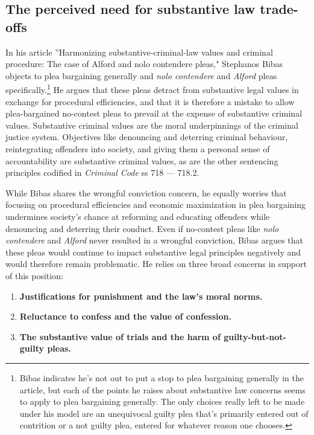 \subsection{The perceived need for substantive law trade-offs}

In his article ''Harmonizing substantive-criminal-law values and criminal procedure: The case of Alford and nolo contendere pleas," Stephanos Bibas objects to plea bargaining generally and \textit{nolo contendere} and \textit{Alford} pleas specifically.\footnote{Bibas indicates he's not out to put a stop to plea bargaining generally in the article, but each of the points he raises about substantive law concerns seems to apply to plea bargaining generally. The only choices really left to be made under his model are an unequivocal guilty plea that's primarily entered out of contrition or a not guilty plea, entered for whatever reason one chooses.} He argues that these pleas detract from substantive legal values in exchange for procedural efficiencies, and that it is therefore a mistake to allow plea-bargained no-contest pleas to prevail at the expense of substantive criminal values. Substantive criminal values are the moral underpinnings of the criminal justice system. Objectives like denouncing and deterring criminal behaviour, reintegrating offenders into society, and giving them a personal sense of accountability are substantive criminal values, as are the other sentencing principles codified in \textit{Criminal Code} ss 718 — 718.2.

While Bibas shares the wrongful conviction concern, he equally worries that focusing on procedural efficiencies and economic maximization in plea bargaining undermines society's chance at reforming and educating offenders while denouncing and deterring their conduct. Even if no-contest pleas like \textit{nolo contendere} and \textit{Alford} never resulted in a wrongful conviction, Bibas argues that these pleas would continue to impact substantive legal principles negatively and would therefore remain problematic. He relies on three broad concerns in support of this position:

\begin{enumerate}
    \item \textbf{Justifications for punishment and the law's moral norms.} 
    \item \textbf{Reluctance to confess and the value of confession.}
    \item \textbf{The substantive value of trials and the harm of guilty-but-not-guilty pleas.}
\end{enumerate}

